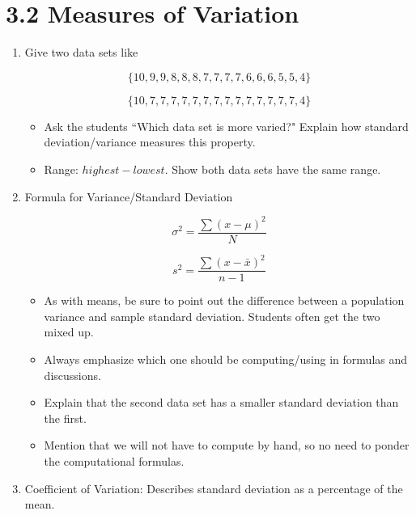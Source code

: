 \documentclass{article}
\begin{document}
\section*{3.2  Measures of Variation}

\begin{enumerate}

    \item Give two data sets like

        $$\{10, 9, 9, 8, 8, 8, 7, 7, 7, 7, 6, 6, 6, 5, 5, 4\}$$

        $$\{10, 7, 7, 7, 7, 7, 7, 7, 7, 7, 7, 7, 7, 7, 7, 4\}$$
    \begin{itemize}
    
        \item Ask the students ``Which data set is more varied?" Explain how standard deviation/variance measures this property. 
        
        \item Range: $highest-lowest$. Show both data sets have the same range.
        
    \end{itemize}


    \item Formula for Variance/Standard Deviation
    
    $$\sigma^2 = \frac{ \sum (x-\mu)^2}{N}$$
    
    $$s^2 = \frac{ \sum (x-\bar{x})^2}{n-1}$$
    
        \begin{itemize}
        
            \item As with means, be sure to point out the difference between a population variance and sample standard deviation. Students often get the two mixed up.
            
            \item Always emphasize which one should be computing/using in formulas and discussions.
            
            \item Explain that the second data set has a smaller standard deviation than the first.
            
            \item Mention that we will not have to compute by hand, so no need to ponder the computational formulas.

        \end{itemize}

    \item Coefficient of Variation: Describes standard deviation as a percentage of the mean.
    

\end{enumerate}
\end{document}
